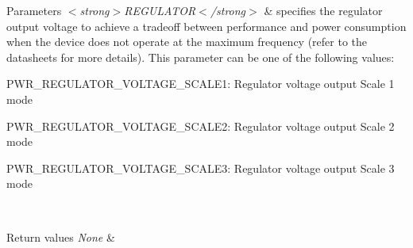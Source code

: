 \begin{DoxyParams}{Parameters}
{\em $<$strong$>$\+R\+E\+G\+U\+L\+A\+T\+O\+R$<$/strong$>$} & specifies the regulator output voltage to achieve a tradeoff between performance and power consumption when the device does not operate at the maximum frequency (refer to the datasheets for more details). This parameter can be one of the following values\+: \begin{DoxyItemize}
\item P\+W\+R\+\_\+\+R\+E\+G\+U\+L\+A\+T\+O\+R\+\_\+\+V\+O\+L\+T\+A\+G\+E\+\_\+\+S\+C\+A\+L\+E1\+: Regulator voltage output Scale 1 mode \item P\+W\+R\+\_\+\+R\+E\+G\+U\+L\+A\+T\+O\+R\+\_\+\+V\+O\+L\+T\+A\+G\+E\+\_\+\+S\+C\+A\+L\+E2\+: Regulator voltage output Scale 2 mode \item P\+W\+R\+\_\+\+R\+E\+G\+U\+L\+A\+T\+O\+R\+\_\+\+V\+O\+L\+T\+A\+G\+E\+\_\+\+S\+C\+A\+L\+E3\+: Regulator voltage output Scale 3 mode \end{DoxyItemize}
\\
\hline
\end{DoxyParams}

\begin{DoxyRetVals}{Return values}
{\em None} & \\
\hline
\end{DoxyRetVals}
